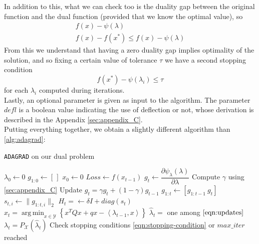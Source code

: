 \documentclass[notitlepage]{article}
\DeclareMathOperator*{\argmin}{arg\,min}
\begin{document}
In addition to this, what we can check too is the duality gap between the original function and the dual function (provided that we know the optimal value), so
\begin{gather*}
  f(x) - \psi(\lambda) \\
  f(x) - f(x^*) \le f(x) - \psi(\lambda)
\end{gather*}
From this we understand that having a zero duality gap implies optimality of the solution, and so fixing a certain value of tolerance $\tau$ we have a second stopping condition
\[
  f(x^*) - \psi(\lambda_i) \le \tau  
\] 
for each $\lambda_i$ computed during iterations.\\
Lastly, an optional parameter is given as input to the algorithm. The parameter $defl$ is a boolean value indicating the use of deflection or not, whose derivation is described in the Appendix \ref{sec:appendix_C}.\\
Putting everything together, we obtain a slightly different algorithm than \ref{alg:adagrad}:
\begin{flushleft}
  \begin{minipage}{\textwidth}
    \begin{algorithm}[H]
      \caption{\texttt{ADAGRAD} on our dual problem}
      \label{alg:my_alg}
      \begin{algorithmic}
          \State $\lambda_0 \gets 0$
          \State $g_{1:0} \gets \left[\,\right]$
          \State $x_0 \gets 0$
            \State $Loss \gets f(x_{t-1})$
            \State $g_t \gets \dfrac{\partial \psi_\lambda(\lambda)}{\partial \lambda}$
                \State Compute $\gamma$ using \ref{sec:appendix_C}
                \State Update $g_t = \gamma g_t + (1 - \gamma) g_{t-1}$
              \EndIf
            \State $g_{1:t} \gets \left[ g_{1:t-1}\ g_t \right]$
            \State $s_{t,i} \gets \| g_{1:t,i} \|_2$
            \State $H_t = \gets \delta \mathit{I} + diag(s_t)$
            \State $x_t = \argmin_{x \in \mathcal{Y}} \left\lbrace x^T Q x + q x - \left\langle \lambda_{t-1},x \right\rangle \right\rbrace$
            \State $\hat{\lambda}_t =$ one among $\eqref{eqn:updates}$
            \State $\lambda_t = P_\mathcal{X}(\hat{\lambda}_t)$ 
            \State Check stopping conditions \eqref{eqn:stopping-condition} or $max\_iter$ reached
          \EndFor
        \EndFunction
      \end{algorithmic}  
    \end{algorithm}
  \end{minipage}
\end{flushleft}
\end{document}
